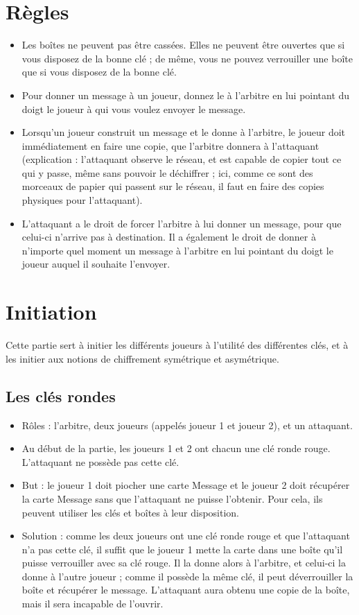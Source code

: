 \documentclass[a4paper,10pt]{article}
\begin{document}
\section{Règles}
\begin{itemize}
\item Les boîtes ne peuvent pas être cassées. Elles ne peuvent être ouvertes que si vous disposez de la bonne clé ; de même, vous ne pouvez verrouiller une boîte que si vous disposez de la bonne clé.
\item Pour donner un message à un joueur, donnez le à l'arbitre en lui pointant du doigt le joueur à qui vous voulez envoyer le message.
\item Lorsqu'un joueur construit un message et le donne à l'arbitre, le joueur doit immédiatement en faire une copie, que l'arbitre donnera à l'attaquant (explication : l'attaquant observe le réseau, et est capable de copier tout ce qui y passe, même sans pouvoir le déchiffrer ; ici, comme ce sont des morceaux de papier qui passent sur le réseau, il faut en faire des copies physiques pour l'attaquant).
\item L'attaquant a le droit de forcer l'arbitre à lui donner un message, pour que celui-ci n'arrive pas à destination. Il a également le droit de donner à n'importe quel moment un message à l'arbitre en lui pointant du doigt le joueur auquel il souhaite l'envoyer. 
\end{itemize}


\section{Initiation}
Cette partie sert à initier les différents joueurs à l'utilité des différentes clés, et à les initier aux notions de chiffrement symétrique et asymétrique.
\subsection{Les clés rondes}
\begin{itemize}
	\item Rôles : l'arbitre, deux joueurs (appelés joueur 1 et joueur 2), et un attaquant.
	\item Au début de la partie, les joueurs 1 et 2 ont chacun une clé ronde rouge. L'attaquant ne possède pas cette clé.
	\item But : le joueur 1 doit piocher une carte Message et le joueur 2 doit récupérer la carte Message sans que l'attaquant ne puisse l'obtenir. Pour cela, ils peuvent utiliser les clés et boîtes à leur disposition.
	\item Solution : comme les deux joueurs ont une clé ronde rouge et que l'attaquant n'a pas cette clé, il suffit que le joueur 1 mette la carte dans une boîte qu'il puisse verrouiller avec sa clé rouge. Il la donne alors à l'arbitre, et celui-ci la donne à l'autre joueur ; comme il possède la même clé, il peut déverrouiller la boîte et récupérer le message. L'attaquant aura obtenu une copie de la boîte, mais il sera incapable de l'ouvrir.
\end{itemize}
\end{document}
